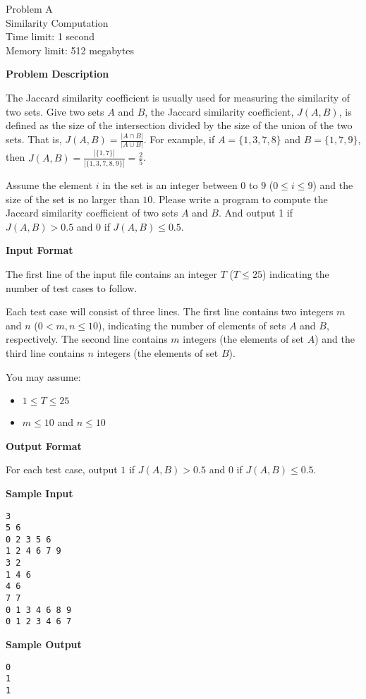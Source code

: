 \begin{center}
    {\LARGE Problem A}\vspace{1mm}\\
    {\Large Similarity Computation}\\
    {Time limit: 1 second}\\
    {Memory limit: 512 megabytes}
\end{center}

\textbf{\large Problem Description}

The Jaccard similarity coefficient is usually used for measuring the similarity of 
two sets. Give two sets $A$ and $B$, the Jaccard similarity coefficient, $J(A,B)$, 
is defined as the size of the intersection divided by the size of the union of the 
two sets. That is, $J(A,B)= \frac{|A\cap B|}{|A\cup B|}$. For example, if 
$A=\{1, 3, 7 , 8\}$ and $B=\{1, 7, 9\}$, then 
$J(A, B)=\frac{|\{1,7\}|}{|\{1, 3, 7, 8, 9\}|}=\frac{2}{5}$.

Assume the element $i$ in the set is an integer between $0$ to $9$ ($0\le i\le9$) 
and the size of the set is no larger than $10$. Please write a program to compute 
the Jaccard similarity coefficient of two sets $A$ and $B$. And output 1 if 
$J(A,B)>0.5$ and $0$ if $J(A,B)\le0.5$.

\textbf{\large Input Format}

The first line of the input file contains an integer $T$ ($T\le25$) indicating 
the number of test cases to follow. 

Each test case will consist of three lines. The first line contains two integers 
$m$ and $n$ ($0<m, n\le 10$), indicating the number of elements of sets $A$ and $B$, 
respectively. The second line contains $m$ integers (the elements of set $A$) and 
the third line contains $n$ integers (the elements of set $B$). 

You may assume:
\begin{itemize}
    \tightlist{}
    \item $1 \le T \le 25$
    \item $m\le 10$ and $n \le 10$
\end{itemize}


\textbf{\large Output Format}

For each test case, output $1$ if $J(A,B)>0.5$ and $0$ if $J(A,B)\le0.5$.

\textbf{\large Sample Input}

\begin{verbatim}
3
5 6
0 2 3 5 6
1 2 4 6 7 9
3 2
1 4 6
4 6
7 7
0 1 3 4 6 8 9
0 1 2 3 4 6 7
\end{verbatim}

\textbf{\large Sample Output}

\begin{verbatim}
0
1
1
\end{verbatim}
